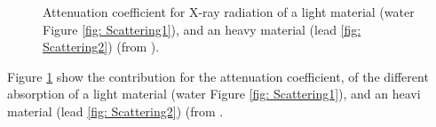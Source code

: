 \begin{figure}[]
%
\centering
%
\quad
%
%
\caption{Attenuation coefficient for X-ray radiation of a light material (water Figure \ref{fig: Scattering1}), and an heavy material (lead \ref{fig: Scattering2}) (from \cite{article_res_geat}).}
\label{fig :AttenuationCoefficient}
%
\end{figure}
Figure \ref{fig :AttenuationCoefficient} show the contribution for the attenuation coefficient, of the different absorption of a light material (water Figure \ref{fig: Scattering1}), and an heavi material (lead \ref{fig: Scattering2}) (from \cite{article_res_geat}.

